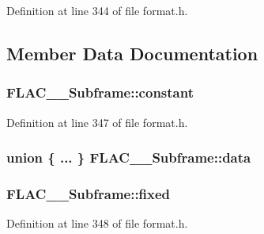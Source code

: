 Definition at line 344 of file format.\+h.



\subsection{Member Data Documentation}
\subsubsection[{\texorpdfstring{constant}{constant}}]{ F\+L\+A\+C\+\_\+\+\_\+\+Subframe\+::constant}\hypertarget{struct_f_l_a_c_____subframe_a2b6c0b6a78e11a3f07ad018ebdbae053}{}\label{struct_f_l_a_c_____subframe_a2b6c0b6a78e11a3f07ad018ebdbae053}


Definition at line 347 of file format.\+h.

\subsubsection[{\texorpdfstring{data}{data}}]{\setlength{\rightskip}{0pt plus 5cm}union \{ ... \}   F\+L\+A\+C\+\_\+\+\_\+\+Subframe\+::data}\hypertarget{struct_f_l_a_c_____subframe_ad29d60acad1bac7faf6987b26c816039}{}\label{struct_f_l_a_c_____subframe_ad29d60acad1bac7faf6987b26c816039}
\subsubsection[{\texorpdfstring{fixed}{fixed}}]{ F\+L\+A\+C\+\_\+\+\_\+\+Subframe\+::fixed}\hypertarget{struct_f_l_a_c_____subframe_a62b0c96288ec264ca09aba6c7c26fc0b}{}\label{struct_f_l_a_c_____subframe_a62b0c96288ec264ca09aba6c7c26fc0b}


Definition at line 348 of file format.\+h.

